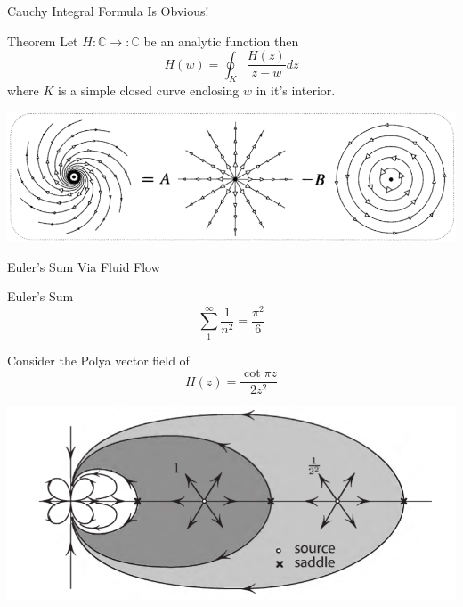 \documentclass[9pt]{beamer}
\begin{document}
\begin{frame}{Cauchy Integral Formula Is Obvious!}
  \begin{block}{Theorem}
    Let $H:\mathbb{C}\to:\mathbb{C}$ be an analytic function then $$H(w)=\oint_K\frac{H(z)}{z-w}dz$$ where $K$ is a simple closed curve 
    enclosing $w$ in it's interior.
  \end{block}
  \begin{center}
    \includegraphics[scale=0.35]{formula.png}
  \end{center}
\end{frame}

\begin{frame}{Euler's Sum Via Fluid Flow}
  \begin{block}{Euler's Sum}
    $$\sum_1^\infty\frac{1}{n^2}=\frac{\pi^2}{6}$$ 
  \end{block}
  \pause
  \begin{block}{}
    Consider the Polya vector field of $$H(z)=\frac{\cot\pi z}{2z^2}$$
    \begin{center}
      \includegraphics[scale=0.2]{euler.png}
    \end{center}
  \end{block}
\end{frame}


\end{document}
